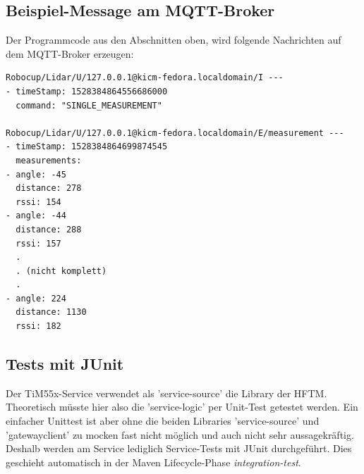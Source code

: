 \subsection{Beispiel-Message am MQTT-Broker}
Der Programmcode aus den Abschnitten oben, wird folgende Nachrichten auf dem MQTT-Broker erzeugen:
\begin{lstlisting}
Robocup/Lidar/U/127.0.0.1@kicm-fedora.localdomain/I ---
- timeStamp: 1528384864556686000
  command: "SINGLE_MEASUREMENT"

Robocup/Lidar/U/127.0.0.1@kicm-fedora.localdomain/E/measurement ---
- timeStamp: 1528384864699874545
  measurements:
- angle: -45
  distance: 278
  rssi: 154
- angle: -44
  distance: 288
  rssi: 157
  .
  . (nicht komplett)
  .
- angle: 224
  distance: 1130
  rssi: 182
\end{lstlisting}

\subsection{Tests mit JUnit}
Der TiM55x-Service verwendet als '\Gls{service-source}' die Library der HFTM. Theoretisch müsste hier also die '\Gls{service-logic}' per Unit-Test getestet werden. Ein einfacher Unittest ist aber ohne die beiden Libraries '\Gls{service-source}' und '\Gls{gatewayclient}' zu mocken fast nicht möglich und auch nicht sehr aussagekräftig. Deshalb werden am Service lediglich Service-Tests mit JUnit durchgeführt. Dies geschieht automatisch in der Maven Lifecycle-Phase \textit{integration-test}.
